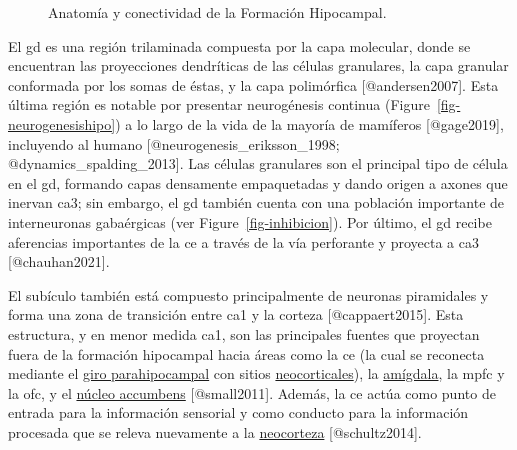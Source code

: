 \documentclass[
  11pt]{../MastersDoctoralThesisUNAM}
\begin{document}
\begin{figure}
\begin{minipage}{0.50\linewidth}
{}


\end{minipage}%

\caption{\label{fig-formacion}Anatomía y conectividad de la Formación
Hipocampal.}

\end{figure}%

El \ac{gd} es una región trilaminada compuesta por la capa molecular,
donde se encuentran las proyecciones dendríticas de las células
granulares, la capa granular conformada por los somas de éstas, y la
capa polimórfica {[}@andersen2007{]}. Esta última región es notable por
presentar neurogénesis continua (Figure~\ref{fig-neurogenesishipo}) a lo
largo de la vida de la mayoría de mamíferos {[}@gage2019{]}, incluyendo
al humano {[}@neurogenesis\_eriksson\_1998;
@dynamics\_spalding\_2013{]}. Las células granulares son el principal
tipo de célula en el \ac{gd}, formando capas densamente empaquetadas y
dando origen a axones que inervan \ac{ca}3; sin embargo, el \ac{gd}
también cuenta con una población importante de interneuronas gabaérgicas
(ver Figure~\ref{fig-inhibicion}). Por último, el \ac{gd} recibe
aferencias importantes de la \ac{ce} a través de la vía perforante y
proyecta a \ac{ca}3 {[}@chauhan2021{]}.

El subículo también está compuesto principalmente de neuronas
piramidales y forma una zona de transición entre \ac{ca}1
\colorbox{BurntOrange}{y la corteza} {[}@cappaert2015{]}. Esta
estructura, y en menor medida \ac{ca}1, son las principales fuentes que
proyectan fuera de la formación hipocampal hacia áreas como la \ac{ce}
(la cual se reconecta mediante el \href{AppendixB.qmd\#term-id-66}{giro
parahipocampal} con sitios
\href{AppendixB.qmd\#term-id-68}{neocorticales}), la
\href{AppendixB.qmd\#term-id-13}{amígdala}, la
 \ac{mpfc} y la \ac{ofc}, y el
\href{AppendixB.qmd\#term-id-27}{núcleo accumbens} {[}@small2011{]}.
Además, la \ac{ce} actúa como punto de entrada para la información
sensorial y como conducto para la información procesada que se releva
nuevamente a la \href{AppendixB.qmd\#term-id-68}{neocorteza}
{[}@schultz2014{]}.
\end{document}
